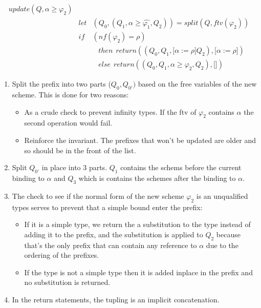 \begin{eqnarray*}
update(Q, \alpha \geq \varphi_2) \\
\hspace{10pt} &let & (Q_0, (Q_1, \alpha \geq \hat{\varphi_1}, Q_2)) = split(Q, ftv(\varphi_2)) \\
              &if & (nf(\varphi_2)= \rho) \\
              &\hspace{5pt}& \hspace{10pt} then \hspace{5pt} return ((Q_0, Q_1, \lbrack \alpha := \rho \rbrack Q_2), \lbrack \alpha := \rho \rbrack) \\
              &\hspace{5pt}& \hspace{10pt} else \hspace{5pt} return ((Q_0, Q_1, \alpha \geq \varphi_2, Q_2), \lbrack \rbrack)
\end{eqnarray*}

\begin{enumerate}
\item{ Split the prefix into two parts ($Q_0, Q_{0'})$ based on the free variables of the new scheme. This is done for two reasons:  
		\begin{itemize}
		\item As a crude check to prevent infinity types. If the ftv of $\varphi_2$ contains $\alpha$ the second operation would fail.
		\item Reinforce the invariant. The prefixes that won't be updated are older and so should be in the front of the list.
		\end{itemize}
     }
\item Split $Q_{0'}$ in place into 3 parts. $Q_1$ contains the schems before the current binding to $\alpha$ and $Q_3$ which is contains the schemes after the binding to $\alpha$.
\item{ The check to see if the normal form of the new scheme $\varphi_2$ is an unqualified types serves to prevent that a simple bound enter the prefix:
		\begin{itemize}
		\item If it is a simple type, we return the a substitution to the type instead of adding it to the prefix, and the substitution is applied to $Q_2$ because that's the only prefix that can contain any reference to $\alpha$ due to the ordering of the prefixes.
		\item If the type is not a simple type then it is added inplace in the prefix and no substitution is returned.
		\end{itemize}
     }
\item In the return statements, the tupling is an implicit concatenation. 
\end{enumerate}
